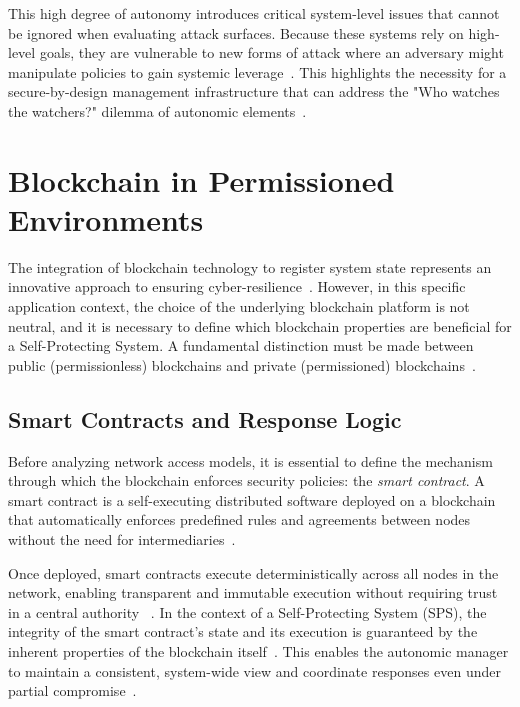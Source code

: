 This high degree of autonomy introduces critical system-level issues that cannot be ignored when evaluating attack surfaces. Because these systems rely on high-level goals, they are vulnerable to new forms of attack where an adversary might manipulate policies to gain systemic leverage~\cite{chess2003security}. This highlights the necessity for a secure-by-design management infrastructure that can address the "Who watches the watchers?" dilemma of autonomic elements~\cite{chess2003security, pekaric2023systematic}.

\section{Blockchain in Permissioned Environments}
\label{sec:tech_permissioned_blockchain}

The integration of blockchain technology to register system state represents an innovative approach to ensuring cyber-resilience~\cite{albero2026blockchain}. However, in this specific application context, the choice of the underlying blockchain platform is not neutral, and it is necessary to define which blockchain properties are beneficial for a Self-Protecting System. A fundamental distinction must be made between public (permissionless) blockchains and private (permissioned) blockchains~\cite{wang2022bft}.

\subsection{Smart Contracts and Response Logic}
Before analyzing network access models, it is essential to define the mechanism through which the blockchain enforces security policies: the \textit{smart contract}. A smart contract is a self-executing distributed software deployed on a blockchain that automatically enforces predefined rules and agreements between nodes without the need for intermediaries~\cite{buterin2013ethereum}.

Once deployed, smart contracts execute deterministically across all nodes in the network, enabling transparent and immutable execution without requiring trust in a central authority ~\cite{buterin2013ethereum}. In the context of a Self-Protecting System (SPS), the integrity of the smart contract's state and its execution is guaranteed by the inherent properties of the blockchain itself~\cite{albero2026blockchain}. This enables the autonomic manager to maintain a consistent, system-wide view and coordinate responses even under partial compromise~\cite{albero2026blockchain}.

